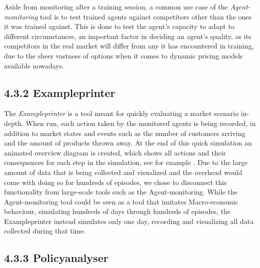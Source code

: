 Aside from monitoring after a training session, a common use case of the \emph{Agent-monitoring} tool is to test trained agents against competitors other than the ones it was trained against. This is done to test the agent's capacity to adapt to different circumstances, an important factor in deciding an agent's quality, as its competitors in the real market will differ from any it has encountered in training, due to the sheer vastness of options when it comes to dynamic pricing models available nowadays. %

\subsection*{4.3.2 Exampleprinter}\label{subsec:Exampleprinter}

The \emph{Exampleprinter} is a tool meant for quickly evaluating a market scenario in-depth. When run, each action taken by the monitored agents is being recorded, in addition to market states and events such as the number of customers arriving and the amount of products thrown away. At the end of this quick simulation an animated overview diagram is created, which shows all actions and their consequences for each step in the simulation, see for example . Due to the large amount of data that is being collected and visualized and the overhead would come with doing so for hundreds of episodes, we chose to disconnect this functionality from large-scale tools such as the Agent-monitoring. While the Agent-monitoring tool could be seen as a tool that imitates Macro-economic behaviour, simulating hundreds of days through hundreds of episodes, the Exampleprinter instead simulates only one day, recording and visualizing all data collected during that time.

\subsection*{4.3.3 Policyanalyser}\label{subsec:Policyanalyser}


